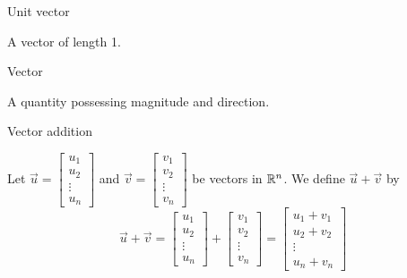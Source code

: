 \documentclass{ximera}
\begin{document}

Unit vector

\begin{expandable}{}{}
    A vector of length 1.
\end{expandable}


Vector

\begin{expandable}{}{}
    A quantity possessing magnitude and direction.
\end{expandable}


Vector addition

\begin{expandable}{}{}
  Let $\vec{u}=\begin{bmatrix}
u_1\\
u_2\\
\vdots\\
u_n
\end{bmatrix}$ and $\vec{v}=\begin{bmatrix}
v_1\\
v_2\\
\vdots\\
v_n
\end{bmatrix}$ be vectors in $\mathbb{R}^n$.  We define $\vec{u}+\vec{v}$ by
  $$\vec{u}+\vec{v}=\begin{bmatrix}
u_1\\
u_2\\
\vdots\\
u_n
\end{bmatrix}+\begin{bmatrix}
v_1\\
v_2\\
\vdots\\
v_n
\end{bmatrix}=\begin{bmatrix}
u_1+v_1\\
u_2+v_2\\
\vdots\\
u_n+v_n
\end{bmatrix}$$
  \end{expandable}
\end{document}
